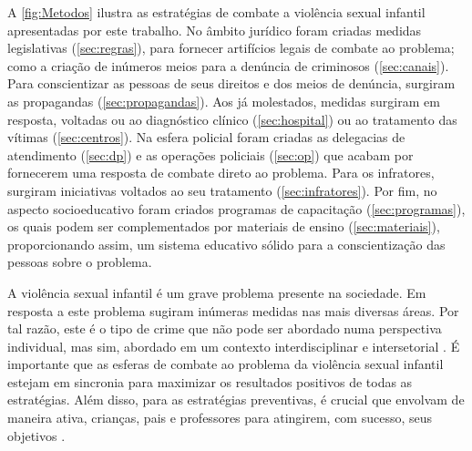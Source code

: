 A \autoref{fig:Metodos} ilustra as estratégias de combate a violência sexual infantil apresentadas por este trabalho. No âmbito jurídico foram criadas medidas legislativas (\autoref{sec:regras}), para fornecer artifícios legais de combate ao problema; como a criação de inúmeros meios para a denúncia de criminosos (\autoref{sec:canais}). Para conscientizar as pessoas de seus direitos e dos meios de denúncia, surgiram as propagandas (\autoref{sec:propagandas}). Aos já molestados, medidas surgiram em resposta, voltadas ou ao diagnóstico clínico (\autoref{sec:hospital}) ou ao tratamento das vítimas (\autoref{sec:centros}). Na esfera policial foram criadas as delegacias de atendimento (\autoref{sec:dp}) e as operações policiais (\autoref{sec:op}) que acabam por fornecerem uma resposta de combate direto ao problema. Para os infratores, surgiram iniciativas voltados ao seu tratamento  (\autoref{sec:infratores}). Por fim, no aspecto socioeducativo foram criados programas de capacitação (\autoref{sec:programas}), os quais podem ser complementados por materiais de ensino (\autoref{sec:materiais}), proporcionando assim, um sistema educativo sólido para a conscientização das pessoas sobre o problema. 

\vspace{-0.35cm}

A violência sexual infantil é um grave problema presente na sociedade. Em resposta a este problema sugiram inúmeras medidas nas mais diversas áreas. Por tal razão, este é o tipo de crime que não pode ser abordado numa perspectiva individual, mas sim, abordado em um contexto interdisciplinar e intersetorial \cite{maria2010papel, pinto2017avaliaccao}. %
É importante que as esferas de combate ao problema da violência sexual infantil estejam em sincronia para maximizar os resultados positivos de todas as estratégias. Além disso, para as estratégias preventivas, é crucial que envolvam de maneira ativa, crianças, pais
e professores para atingirem, com sucesso, seus objetivos \cite{dip2016advancing}. 




